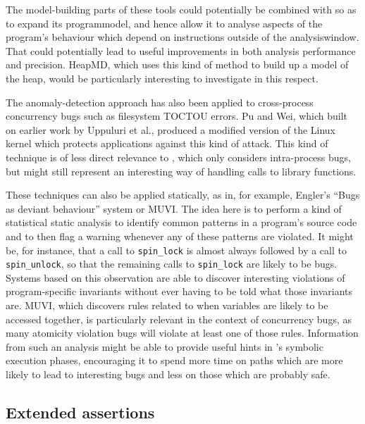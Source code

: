 The model-building parts of these tools could potentially be combined
with {\technique} so as to expand its \gls{programmodel}, and hence
allow it to analyse aspects of the program's behaviour which depend on
instructions outside of the \gls{analysiswindow}.  That could
potentially lead to useful improvements in both analysis performance
and precision.  HeapMD\cite{Chilimbi2006}, which uses this kind of
method to build up a model of the heap, would be particularly
interesting to investigate in this respect.

The anomaly-detection approach has also been applied to cross-process
concurrency bugs such as filesystem TOCTOU
errors\cite[pages~44--45]{Apple2012SecureCoding}.  Pu and
Wei\cite{Pu2006}, which built on earlier work by Uppuluri et
al.\cite{Uppuluri2005}, produced a modified version of the Linux
kernel which protects applications against this kind of attack.  This
kind of technique is of less direct relevance to {\technique}, which
only considers intra-process bugs, but might still represent an
interesting way of handling calls to library functions.

These techniques can also be applied statically, as in, for example,
Engler's ``Bugs as deviant behaviour''
system\cite{Engler2001} or MUVI\cite{Lu2007}.  The idea
here is to perform a kind of statistical static analysis to identify
common patterns in a program's source code and to then flag a warning
whenever any of these patterns are violated.  It might be, for
instance, that a call to \texttt{spin\_lock} is almost always followed
by a call to \texttt{spin\_unlock}, so that the remaining calls to
\texttt{spin\_lock} are likely to be bugs.  Systems based on this
observation are able to discover interesting violations of
program-specific invariants without ever having to be told what those
invariants are.  MUVI, which discovers rules related to when variables
are likely to be accessed together, is particularly relevant in the
context of concurrency bugs, as many atomicity violation bugs will
violate at least one of those rules.  Information from such an
analysis might be able to provide useful hints in {\technique}'s
symbolic execution phases, encouraging it to spend more time on paths
which are more likely to lead to interesting bugs and less on those
which are probably safe.

\subsection{Extended assertions}

